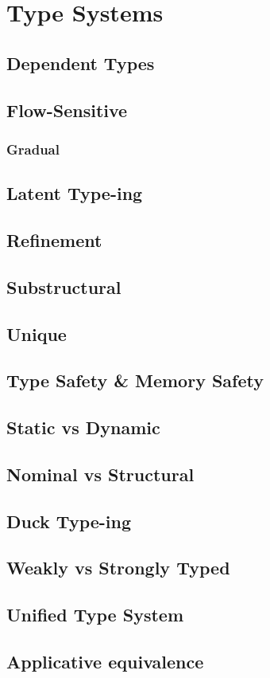\chapter{Type Systems}


\section{Dependent Types}
\section{Flow-Sensitive}
\subsection{Gradual}
\section{Latent Type-ing}
\section{Refinement}
\section{Substructural}
\section{Unique}

\section{Type Safety \& Memory Safety }
\section{Static vs Dynamic}
\section{Nominal vs Structural}
\section{Duck Type-ing}

\section{Weakly vs Strongly Typed}

\section{Unified Type System}

\section{Applicative equivalence}
